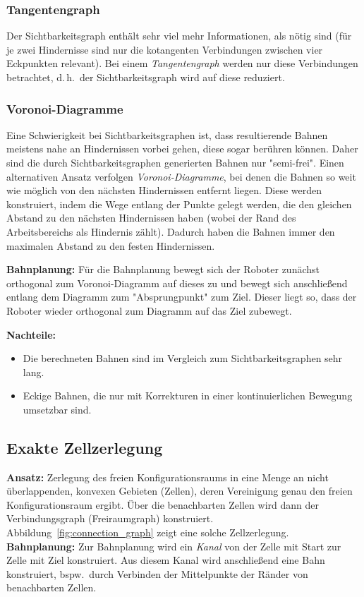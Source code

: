 \documentclass[a4paper, 11pt, accentcolor = tud3b]{tudreport}
\renewcommand{\dh}{d.\,h.~}
\newcommand{\bspw}{bspw.~}
\begin{document}
				\subsubsection{Tangentengraph}
					Der Sichtbarkeitsgraph enthält sehr viel mehr Informationen, als nötig sind (für je zwei Hindernisse sind nur die kotangenten Verbindungen zwischen vier Eckpunkten relevant). Bei einem \emph{Tangentengraph} werden nur diese Verbindungen betrachtet, \dh der Sichtbarkeitsgraph wird auf diese reduziert.

				\subsubsection{Voronoi-Diagramme}
					Eine Schwierigkeit bei Sichtbarkeitsgraphen ist, dass resultierende Bahnen meistens nahe an Hindernissen vorbei gehen, diese sogar berühren können. Daher sind die durch Sichtbarkeitsgraphen generierten Bahnen nur "semi-frei". Einen alternativen Ansatz verfolgen \emph{Voronoi-Diagramme}, bei denen die Bahnen so weit wie möglich von den nächsten Hindernissen entfernt liegen. Diese werden konstruiert, indem die Wege entlang der Punkte gelegt werden, die den gleichen Abstand zu den nächsten Hindernissen haben (wobei der Rand des Arbeitsbereichs als Hindernis zählt). Dadurch haben die Bahnen immer den maximalen Abstand zu den festen Hindernissen.
					
					\textbf{Bahnplanung:} Für die Bahnplanung bewegt sich der Roboter zunächst orthogonal zum Voronoi-Diagramm auf dieses zu und bewegt sich anschließend entlang dem Diagramm zum "Absprungpunkt" zum Ziel. Dieser liegt so, dass der Roboter wieder orthogonal zum Diagramm auf das Ziel zubewegt.
					
					\textbf{Nachteile:}
					\begin{itemize}
						\item Die berechneten Bahnen sind im Vergleich zum Sichtbarkeitsgraphen sehr lang.
						\item Eckige Bahnen, die nur mit Korrekturen in einer kontinuierlichen Bewegung umsetzbar sind.
					\end{itemize}

			\subsection{Exakte Zellzerlegung}
				\textbf{Ansatz:} Zerlegung des freien Konfigurationsraums in eine Menge an nicht überlappenden, konvexen Gebieten (Zellen), deren Vereinigung genau den freien Konfigurationsraum ergibt. Über die benachbarten Zellen wird dann der Verbindungsgraph (Freiraumgraph) konstruiert. Abbildung~\ref{fig:connection_graph} zeigt eine solche Zellzerlegung. \\
				\textbf{Bahnplanung:} Zur Bahnplanung wird ein \emph{Kanal} von der Zelle mit Start zur Zelle mit Ziel konstruiert. Aus diesem Kanal wird anschließend eine Bahn konstruiert, \bspw durch Verbinden der Mittelpunkte der Ränder von benachbarten Zellen.
				
\end{document}

